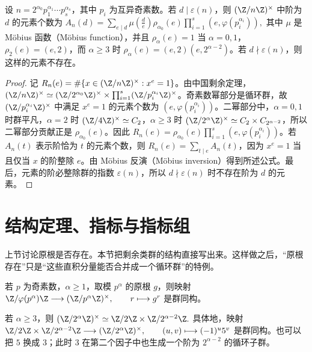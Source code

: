 \begin{theorem}[一般模数中给定阶的元素个数]
设 \(n=2^{\alpha_0}p_1^{\alpha_1}\cdots p_s^{\alpha_s}\)，其中 \(p_i\) 为互异奇素数。若 \(d\mid \varepsilon(n)\)，则 \(\U n\) 中阶为 \(d\) 的元素个数为
\(
A_n(d)=\sum_{e\mid d}\mu\!\left(\frac d e\right)\rho_{\alpha_0}(e)\prod_{i=1}^s (e,\varphi(p_i^{\alpha_i})),
\)
其中 \(\mu\) 是 Möbius 函数（Möbius function），并且 \(\rho_{\alpha}(e)=1\) 当 \(\alpha=0,1\)，\(\rho_2(e)=(e,2)\)，而 \(\alpha\ge3\) 时 \(\rho_{\alpha}(e)=(e,2)(e,2^{\alpha-2})\)。若 \(d\nmid\varepsilon(n)\)，则这样的元素不存在。
\end{theorem}

\begin{proof}
记 \(R_n(e)=\#\{x\in\U n:x^e=1\}\)。由中国剩余定理，\(\U n\simeq \U{2^{\alpha_0}}\times \prod_{i=1}^s\U{p_i^{\alpha_i}}\)。奇素数幂部分是循环群，故 \(\U{p_i^{\alpha_i}}\) 中满足 \(x^e=1\) 的元素个数为 \((e,\varphi(p_i^{\alpha_i}))\)。二幂部分中，\(\alpha=0,1\) 时群平凡，\(\alpha=2\) 时 \(\U4\simeq C_2\)，\(\alpha\ge3\) 时 \(\U{2^\alpha}\simeq C_2\times C_{2^{\alpha-2}}\)，所以二幂部分贡献正是 \(\rho_{\alpha_0}(e)\)。因此 \(R_n(e)=\rho_{\alpha_0}(e)\prod_{i=1}^s(e,\varphi(p_i^{\alpha_i}))\)。若 \(A_n(t)\) 表示阶恰为 \(t\) 的元素个数，则 \(R_n(e)=\sum_{t\mid e}A_n(t)\)，因为 \(x^e=1\) 当且仅当 \(x\) 的阶整除 \(e\)。由 Möbius 反演（Möbius inversion）得到所述公式。最后，元素的阶必整除群的指数 \(\varepsilon(n)\)，所以 \(d\nmid\varepsilon(n)\) 时不存在阶为 \(d\) 的元素。
\end{proof}

\section{结构定理、指标与指标组}

上节讨论原根是否存在。本节把剩余类群的结构直接写出来。这样做之后，“原根存在”只是“这些直积分量能否合并成一个循环群”的特例。

\begin{theorem}[奇素数幂模单位群]
若 $p$ 为奇素数，$\alpha\ge 1$，取模 $p^\alpha$ 的原根 $g$，则映射
\(
  \Cyc{\varphi(p^\alpha)}
  \longrightarrow
  \U{p^\alpha},\qquad
  r\longmapsto g^r
\)
是群同构。
\end{theorem}

\begin{theorem}[二的幂模单位群]
若 $\alpha\ge 3$，则
\(
  \U{2^\alpha}\simeq \Cyc2\times \Cyc{2^{\alpha-2}}.
\)
具体地，映射
\(
  \Cyc2\times \Cyc{2^{\alpha-2}}
  \longrightarrow
  \U{2^\alpha},\qquad
  (u,v)\longmapsto (-1)^u5^v
\)
是群同构。也可以把 $5$ 换成 $3$；此时 $3$ 在第二个因子中也生成一个阶为 $2^{\alpha-2}$ 的循环子群。
\end{theorem}

